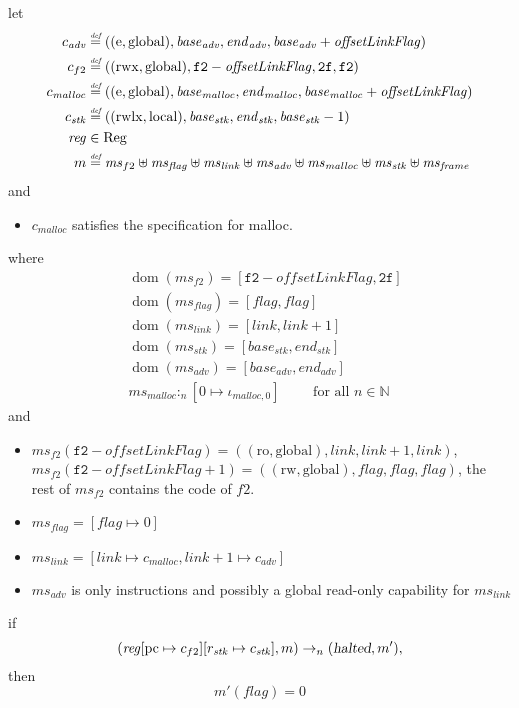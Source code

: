 \documentclass[a4paper]{article}
\newcommand{\update}[2]{[#1 \mapsto #2]}
\newcommand{\defeq}{\stackrel{\textit{\tiny{def}}}{=}}
\DeclareMathOperator{\dom}{dom}
\newcommand{\var}[1]{\mathit{#1}}
\newcommand{\hs}{\var{ms}}
\newcommand{\ms}{\hs}
\newcommand{\pcreg}{\mathrm{pc}}
\newcommand{\start}{\var{base}}
\newcommand{\addrend}{\var{end}}
\newcommand{\reg}{\var{reg}}
\newcommand{\heap}{\var{mem}}
\newcommand{\adv}{\var{adv}}
\newcommand{\link}{\var{link}}
\newcommand{\stk}{\var{stk}}
\newcommand{\flag}{\var{flag}}
\newcommand{\olf}{\var{offsetLinkFlag}}
\newcommand{\halted}{\textsl{halted}}
\newcommand{\heapSat}[3][\heap]{#1 :_{#2} #3}
\newcommand{\codelabel}[1]{\mathit{#1}}
\newcommand{\malloc}{\codelabel{malloc}}
\newcommand{\plaindom}[1]{\mathrm{#1}}
\newcommand{\Regs}{\plaindom{Reg}}
\newcommand{\nats}{\mathbb{N}}
\newcommand{\plainperm}[1]{\mathrm{#1}}
\newcommand{\readonly}{\plainperm{ro}}
\newcommand{\readwrite}{\plainperm{rw}}
\newcommand{\entry}{\plainperm{e}}
\newcommand{\rwx}{\plainperm{rwx}}
\newcommand{\rwlx}{\plainperm{rwlx}}
\newcommand{\local}{\plainperm{local}}
\newcommand{\glob}{\plainperm{global}}
\newcommand{\step}[1][]{\rightarrow_{#1}}
\begin{document}
\begin{lemma}
  \label{lem:correctness-f2}
  let
  \begin{align*}
    c_{\var{adv}} & \defeq ((\entry,\glob),\start_{\adv},\addrend_{\adv},\start_{\adv}+\olf) \\
    c_{f2} & \defeq ((\rwx,\glob),\mathtt{f2}-\olf,\mathtt{2f},\mathtt{f2}) \\
    c_\malloc & \defeq ((\entry,\glob),\start_\malloc,\addrend_\malloc,\start_\malloc+\olf) \\
    c_{\var{stk}} & \defeq ((\rwlx,\local),\start_\stk,\addrend_\stk,\start_\stk-1) \\
    \reg & \in \Regs \\
    m & \defeq \hs_{f2} \uplus 
        \hs_\flag \uplus                
        \ms_{\var{link}} \uplus 
        \hs_\adv \uplus 
        \ms_{\malloc} \uplus 
        \ms_{\var{stk}} \uplus
        \ms_{\var{frame}} 
  \end{align*}
  and
  \begin{itemize}
  \item $c_\malloc$ satisfies the specification for malloc.
  \end{itemize}
  where 
  \begin{align*}
    &\dom(\hs_{f2}) = [\mathtt{f2}-\olf,\mathtt{2f}] \\
    &\dom(\hs_\flag) = [\flag,\flag] \\
    &\dom(\ms_\link) = [\link,\link+1]\\
    &\dom(\ms_\stk) = [\start_\stk, \addrend_\stk]\\
    &\dom(\hs_{\adv}) = [\start_\adv,\addrend_\adv] \\
    &\heapSat[\hs_{\malloc}]{n}{[0 \mapsto \iota_{\malloc,0}]} \qquad \text{ for all $n \in \nats$}
  \end{align*}
  and
  \begin{itemize}
  \item $\ms_{f2}(\mathtt{f2}-\olf) = ((\readonly,\glob),\link,\link+1,\link)$, $\ms_{f2}(\mathtt{f2}-\olf+1) = ((\readwrite,\glob),\flag,\flag,\flag)$, the rest of $\hs_{f2}$ contains the code of $f2$.
  \item $\ms_\flag = [\flag \mapsto 0]$
  \item $\ms_{\var{link}} = [\var{link} \mapsto c_\malloc, \var{link} + 1 \mapsto c_\adv]$
  \item $\hs_\adv$ is only instructions and possibly a global read-only capability for $\hs_\link$
  \end{itemize}
  if 
  \[
    (\reg\update{\pcreg}{c_{f2}}\update{r_\stk}{c_\stk},m) \step[n] (\halted,m'),
  \]
  then
  \[
    m'(\flag) = 0
  \]  
\end{lemma}
\end{document}
